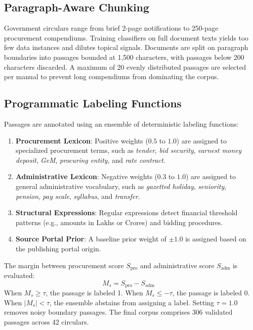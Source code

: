 \documentclass[conference]{IEEEtran}
\begin{document}
\subsection{Paragraph-Aware Chunking}
Government circulars range from brief 2-page notifications to 250-page procurement compendiums. Training classifiers on full document texts yields too few data instances and dilutes topical signals. Documents are split on paragraph boundaries into passages bounded at 1,500 characters, with passages below 200 characters discarded. A maximum of 20 evenly distributed passages are selected per manual to prevent long compendiums from dominating the corpus.

\subsection{Programmatic Labeling Functions}
Passages are annotated using an ensemble of deterministic labeling functions:
\begin{enumerate}
    \item \textbf{Procurement Lexicon}: Positive weights ($0.5$ to $1.0$) are assigned to specialized procurement terms, such as \textit{tender}, \textit{bid security}, \textit{earnest money deposit}, \textit{GeM}, \textit{procuring entity}, and \textit{rate contract}.
    \item \textbf{Administrative Lexicon}: Negative weights ($0.3$ to $1.0$) are assigned to general administrative vocabulary, such as \textit{gazetted holiday}, \textit{seniority}, \textit{pension}, \textit{pay scale}, \textit{syllabus}, and \textit{transfer}.
    \item \textbf{Structural Expressions}: Regular expressions detect financial threshold patterns (e.g., amounts in Lakhs or Crores) and bidding procedures.
    \item \textbf{Source Portal Prior}: A baseline prior weight of $\pm 1.0$ is assigned based on the publishing portal origin.
\end{enumerate}

The margin between procurement score $S_{\text{pro}}$ and administrative score $S_{\text{adm}}$ is evaluated:
\begin{equation}
    M_s = S_{\text{pro}} - S_{\text{adm}}
\end{equation}
When $M_s \ge \tau$, the passage is labeled 1. When $M_s \le -\tau$, the passage is labeled 0. When $|M_s| < \tau$, the ensemble abstains from assigning a label. Setting $\tau = 1.0$ removes noisy boundary passages. The final corpus comprises 306 validated passages across 42 circulars.
\end{document}
